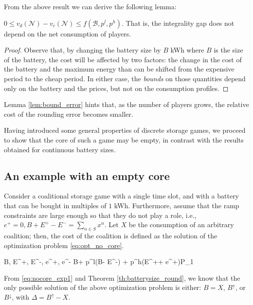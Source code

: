 \documentclass[sigconf, table]{acmart}
\newcommand{\N}{\mathcal{N}}
\newcommand{\Bat}{\mathcal{B}}
\newcommand{\Ep}{E^+}
\newcommand{\Ene}{E^-}
\newcommand{\ep}{e^+}
\newcommand{\ene}{e^-}
\newcommand{\pricelow}{p^l}
\newcommand{\pricehigh}{p^h}
\newcommand{\bat}{B}
\newcommand{\ramp}{\delta}
\newcommand{\cons}{x}
\begin{document}
From the above result we can derive the following lemma:

\begin{lemma}\label{lem:bound_error}
$ 0 \leq v_d(\N) - v_c(\N) \leq f(\Bat, \pricelow, \pricehigh)$. That is, the integrality gap does not depend on the net consumption of players.
\end{lemma}

\begin{proof}
Observe that, by changing the battery size by $B$ kWh where $B$ is the size of the battery, the cost will be affected by two factors: the change in the cost of the battery and the maximum energy than can be shifted from the expensive period to the cheap period. In either case, the \emph{bounds} on those quantities depend only on the battery and the prices, but not on the consumption profiles.
\end{proof}

Lemma \ref{lem:bound_error} hints that, as the number of players grows, the relative cost of the rounding error becomes smaller.

Having introduced some general properties of discrete storage games, we proceed to show that the core of such a game may be empty, in contrast with the results obtained for continuous battery sizes.

\subsection{An example with an empty core}\label{sec:empty_core}

Consider a coalitional storage game with a single time slot, and with a battery that can be bought in multiples of $1$ kWh. Furthermore, assume that the ramp constraints are large enough so that they do not play a role, i.e., $\ep = 0, \bat + \Ep - \Ene = \sum_{n \in S} \cons^n$.
Let $X$ be the consumption of an arbitrary coalition; then, the cost of the coalition is defined as the solution of the optimization problem \eqref{eq:opt_no_core}.
\begin{mini!}[4]
{\bat, \Ep, \Ene, \ep, \ene}{ \bat + \pricelow(\bat - \Ene) +  \pricehigh(\Ep + \ep)}{}{P_1}\label{eq:opt_no_core}
\addConstraint{\ramp\bat + \ep - \ene}{ = X}{}
\addConstraint{\bat + \Ep - \Ene}{= \ramp\bat - \ene = X}{}{\label{eq:nocore_exp1}}
\addConstraint{\bat \in \mathbb{Z}^+}{\Ep, \Ene, \ep, \ene \geq 0}{}
\end{mini!}

From \eqref{eq:nocore_exp1} and Theorem \ref{th:batterysize_round}, we know that the only possible solution of the above optimization problem is either: $B = X$, $B^{\uparrow}$, or $B^{\downarrow}$, with $\Delta = B^{\uparrow} - X$.
\end{document}
